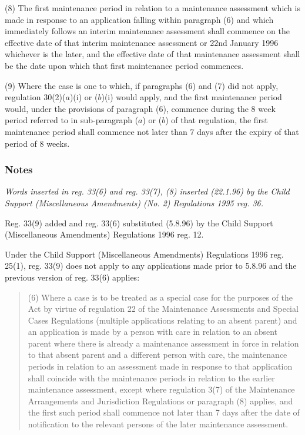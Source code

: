 \documentclass[a4paper]{article}
\newcommand\amendment[1]{\subsubsection*{Notes}{\itshape\frenchspacing\footnotesize #1 \par}}
\begin{document}
(8) The first maintenance period in relation to a maintenance assessment which is made in response to an application falling within paragraph (6) and which immediately follows an interim maintenance assessment shall commence on the effective date of that interim maintenance assessment or 22nd January 1996 whichever is the later, and the effective date of that maintenance assessment shall be the date upon which that first maintenance period commences.

(9) Where the case is one to which, if paragraphs (6) and (7) did not apply, regulation 30(2)($a$)(i) or ($b$)(i) would apply, and the first maintenance period would, under the provisions of paragraph (6), commence during the 8 week period referred to in sub-paragraph ($a$) or ($b$) of that regulation, the first maintenance period shall commence not later than 7 days after the expiry of that period of 8 weeks.

\amendment{
Words inserted in reg. 33(6) and reg. 33(7), (8) inserted (22.1.96) by the Child Support (Miscellaneous Amendments) (No. 2) Regulations 1995 reg. 36.

Reg. 33(9) added and reg. 33(6) substituted (5.8.96) by the Child Support (Miscellaneous Amendments) Regulations 1996 reg. 12.

Under the Child Support (Miscellaneous Amendments) Regulations 1996 reg. 25(1), reg. 33(9) does not apply to any applications made prior to 5.8.96 and the previous version of reg. 33(6) applies:
\begin{quotation}
(6) Where a case is to be treated as a special case for the purposes of the Act by virtue of regulation 22 of the Maintenance Assessments and Special Cases Regulations (multiple applications relating to an absent parent) and an application is made by a person with care in relation to an absent parent where there is already a maintenance assessment in force in relation to that absent parent and a different person with care, the maintenance periods in relation to an assessment made in response to that application shall coincide with the maintenance periods in relation to the earlier maintenance assessment, 
except where regulation 3(7) of the Maintenance Arrangements and Jurisdiction Regulations or paragraph (8) applies,  %
and the first such period shall commence not later than 7 days after the date of notification to the relevant persons of the later maintenance assessment.
\end{quotation}
}
\end{document}
